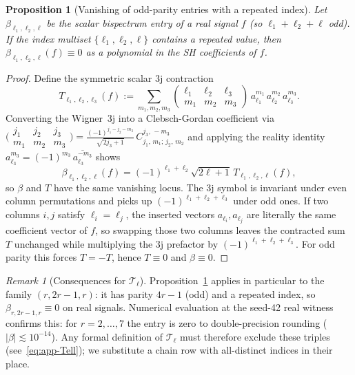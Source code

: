 \documentclass{article}
\newtheorem{proposition}[theorem]{Proposition}
\theoremstyle{definition}
\theoremstyle{remark}
\newtheorem{remark}[theorem]{Remark}
\newcommand{\CG}[6]{C^{#5,\,#6}_{#1,\,#2;\,#3,\,#4}}
\newcommand{\conj}[1]{\overline{#1}}
\theoremstyle{definition}
\begin{document}
\begin{proposition}[Vanishing of odd-parity entries with a repeated index]
\label{prop:app-odd-vanishing}
Let $\beta_{\ell_1,\ell_2,\ell}$ be the scalar bispectrum entry of a
real signal $f$ (so $\ell_1+\ell_2+\ell$ odd). If the index multiset
$\{\ell_1,\ell_2,\ell\}$ contains a repeated value, then
$\beta_{\ell_1,\ell_2,\ell}(f)\equiv 0$ as a polynomial in the SH
coefficients of $f$.
\end{proposition}

\begin{proof}
Define the symmetric scalar 3j contraction
\[
  T_{\ell_1,\ell_2,\ell_3}(f) :=
  \sum_{m_1,m_2,m_3}
  \begin{pmatrix} \ell_1 & \ell_2 & \ell_3 \\
                  m_1 & m_2 & m_3 \end{pmatrix}\,
  a_{\ell_1}^{m_1}\, a_{\ell_2}^{m_2}\, a_{\ell_3}^{m_3} .
\]
Converting the Wigner~3j into a Clebsch-Gordan coefficient via
$\bigl(\begin{smallmatrix} j_1 & j_2 & j_3 \\
       m_1 & m_2 & m_3\end{smallmatrix}\bigr)
= \frac{(-1)^{j_1-j_2-m_3}}{\sqrt{2j_3+1}}\,
  \CG{j_1}{m_1}{j_2}{m_2}{j_3}{-m_3}$ and applying the reality identity
$a_{\ell_3}^{m_3} = (-1)^{m_3}\,\conj{a_{\ell_3}^{-m_3}}$ shows
\[
  \beta_{\ell_1,\ell_2,\ell}(f)
  = (-1)^{\ell_1+\ell_2}\sqrt{2\ell+1}\,
    T_{\ell_1,\ell_2,\ell}(f),
\]
so $\beta$ and $T$ have the same vanishing locus. The 3j symbol is
invariant under even column permutations and picks up
$(-1)^{\ell_1+\ell_2+\ell_3}$ under odd ones. If two columns $i,j$
satisfy $\ell_i=\ell_j$, the inserted vectors $a_{\ell_i},a_{\ell_j}$
are literally the same coefficient vector of $f$, so swapping those
two columns leaves the contracted sum $T$ unchanged while multiplying
the 3j prefactor by $(-1)^{\ell_1+\ell_2+\ell_3}$. For odd parity this
forces $T=-T$, hence $T\equiv 0$ and $\beta\equiv 0$.
\end{proof}

\begin{remark}[Consequences for $\mathcal{T}_\ell$]
\label{rem:app-Tell-zero-rows}
Proposition~\ref{prop:app-odd-vanishing} applies in particular to the
family $(r,2r-1,r)$: it has parity $4r-1$ (odd) and a repeated index,
so $\beta_{r,2r-1,r}\equiv 0$ on real signals. Numerical evaluation at
the seed-42 real witness confirms this: for $r=2,\dots,7$ the entry is
zero to double-precision rounding ($|\beta|\lesssim 10^{-14}$). Any
formal definition of $\mathcal{T}_\ell$ must therefore exclude these
triples (see~\eqref{eq:app-Tell}); we substitute a chain row with
all-distinct indices in their place.
\end{remark}
\end{document}
